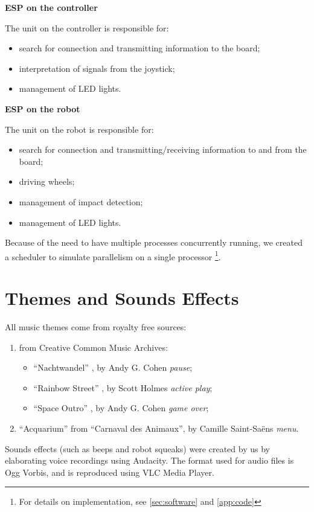\documentclass[a4paper,twoside]{book}
\begin{document}
\begin{appendices}
\textbf{ESP on the controller} 

\beforelist The unit on the controller is responsible for:
\begin{itemize}
\item search for connection and transmitting information to the board;
\item interpretation of signals from the joystick;
\item management of LED lights.
\end{itemize}
\afterlist*

\textbf{ESP on the robot} 

\beforelist The unit on the robot is responsible for:
\begin{itemize}
\item search for connection and transmitting/receiving information to and from the board;
\item driving wheels;
\item management of impact detection;
\item management of LED lights.
\end{itemize}
\afterlist*
Because of the need to have multiple processes concurrently running, we created a scheduler to simulate parallelism on a single processor%
\footnote {For details on implementation, see \autoref{sec:software} and \autoref{app:code}}.

\section{Themes and Sounds Effects}
\label{app:noise}

\beforelist All music themes come from royalty free sources:
\begin{enumerate}
\item from Creative Common Music Archives:
  \begin{itemize}
    \item\textquotedblleft{}Nachtwandel\textquotedblright{} , by Andy G. Cohen \textemdash{}  \textit{pause};
    \item\textquotedblleft{}Rainbow Street\textquotedblright{} , by Scott Holmes \textemdash{} \textit{active play};
    \item\textquotedblleft{}Space Outro\textquotedblright{} , by Andy G. Cohen \textemdash{} \textit{game over};
  \end{itemize}
\item \textquotedblleft{}Acquarium\textquotedblright{} from \textquotedblleft{}Carnaval des Animaux\textquotedblright{}, by Camille Saint-Sa\"ens  \textemdash{} \textit{menu}.
\end{enumerate}
\afterlist*
Sounds effects (such as beeps and robot squeaks) were created by us by elaborating voice recordings using Audacity. 
The format used for audio files is Ogg Vorbis, and is reproduced using VLC Media Player.


\end{appendices}
\end{document}
